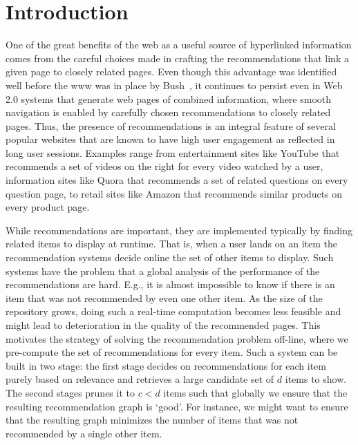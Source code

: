 \begin{abstract}
\iffalse
In this paper, we study the problem of graph recommendations as
variants of bipartite matching problems. We consider the problem
of solving such matching problems in practice at web-scale. To acheive
this we introduce several models to simulate underlying input graph
structures. We then analyze the conditions under which a random sample
of edges using constant memory already suffices to be a
'good' recommendation algorithm as opposed the cases when we may consider
the more classical and involved linear memory polynomial time algorithms.
We also show how to select the number of recommendations per item while
building a website so that there exists a 'perfect' graph recommendation.
\fi

\end{abstract}

\section{Introduction}

One of the great benefits of the web as a useful source of hyperlinked information comes from the careful choices made in crafting the recommendations that link a given page to closely related pages. Even though this advantage was identified well before the www was in place by Bush~\cite{Bush45}, it continues to persist even in Web 2.0 systems that generate web pages of combined information, where smooth navigation is enabled by carefully chosen recommendations to closely related pages. Thus, the presence of recommendations is an integral feature of several popular websites that are known to have high user engagement as reflected in long user sessions. Examples range from entertainment sites like YouTube that recommends a set of videos on the right for every video watched by a user, information sites like Quora that recommends a set of related questions on every question page, to retail sites like Amazon that recommends similar products on every product page. \vs

While recommendations are important, they are implemented typically by finding related items to display at runtime. That is, when a user lands on an item the recommendation systems decide online the set of other items to display. Such systems have the problem that a global analysis of the performance of the recommendations are hard. E.g., it is almost impossible to know if there is an item that was not recommended by even one other item. As the size of the repository grows, doing such a real-time computation becomes less feasible and might lead to deterioration in the quality of the recommended pages.  This motivates the strategy of solving the recommendation problem off-line, where we pre-compute the set of recommendations for every item. Such a system can be built in two stage: the first stage decides on recommendations for each item purely based on relevance and retrieves a large candidate set of $d$ items to show. The second stages prunes it to $c < d$ items such that globally we ensure that the resulting recommendation graph is `good'. For
instance, we might want to ensure that the resulting graph minimizes the number of items that was not recommended by a single other item. \vs

